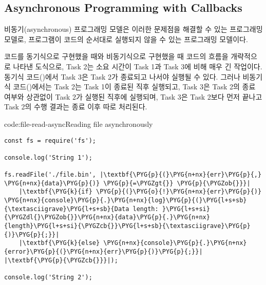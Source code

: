 \subsection*{Asynchronous Programming with Callbacks}

비동기(asynchronous) 프로그래밍 모델은 이러한 문제점을 해결할 수 있는 프로그래밍 모델로, 프로그램이 코드의 순서대로 실행되지 않을 수 있는 프로그래밍 모델이다.


\는 코드를 동기식으로 구현했을 때와 비동기식으로 구현했을 때 코드의 흐름을 개략적으로 나타낸 도식으로, Task 2는 소요 시간이 Task 1과 Task 3에 비해 매우 긴 작업이다. 동기식 코드()에서 Task 3은 Task 2가 종료되고 나서야 실행될 수 있다. 그러나 비동기식 코드()에서는 Task 2는 Task 1이 종료된 직후 실행되고, Task 3은 Task 2의 종료 여부와 상관없이 Task 2가 실행된 직후에 실행되며, Task 3은 Task 2보다 먼저 끝나고 Task 2의 수행 결과는 종료 이후 따로 처리된다.

\begin{code}{code:file-read-async}{Reading file asynchronously}
\begin{verbatim}
const fs = require('fs');

console.log('String 1');

fs.readFile('./file.bin', |\textbf{\PYG{p}{(}\PYG{n+nx}{err}\PYG{p}{,} \PYG{n+nx}{data}\PYG{p}{)} \PYG{p}{=\PYGZgt{}} \PYG{p}{\PYGZob{}}}|
    |\textbf{\PYG{k}{if} \PYG{p}{(}\PYG{o}{!}\PYG{n+nx}{err}\PYG{p}{)} \PYG{n+nx}{console}\PYG{p}{.}\PYG{n+nx}{log}\PYG{p}{(}\PYG{l+s+sb}{\textasciigrave}\PYG{l+s+sb}{Data length: }\PYG{l+s+si}{\PYGZdl{}\PYGZob{}}\PYG{n+nx}{data}\PYG{p}{.}\PYG{n+nx}{length}\PYG{l+s+si}{\PYGZcb{}}\PYG{l+s+sb}{\textasciigrave}\PYG{p}{)}\PYG{p}{;}}|
    |\textbf{\PYG{k}{else} \PYG{n+nx}{console}\PYG{p}{.}\PYG{n+nx}{error}\PYG{p}{(}\PYG{n+nx}{err}\PYG{p}{)}\PYG{p}{;}}|
|\textbf{\PYG{p}{\PYGZcb{}}}|);

console.log('String 2');
\end{verbatim}
\end{code}


